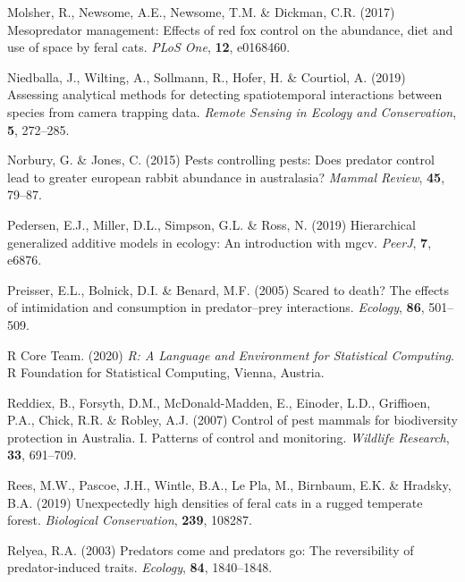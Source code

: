\documentclass[]{elsarticle} %
\begin{document}
\leavevmode\hypertarget{ref-molsher2017mesopredator}{}%
Molsher, R., Newsome, A.E., Newsome, T.M. \& Dickman, C.R. (2017) Mesopredator management: Effects of red fox control on the abundance, diet and use of space by feral cats. \emph{PLoS One}, \textbf{12}, e0168460.

\leavevmode\hypertarget{ref-niedballa2019assessing}{}%
Niedballa, J., Wilting, A., Sollmann, R., Hofer, H. \& Courtiol, A. (2019) Assessing analytical methods for detecting spatiotemporal interactions between species from camera trapping data. \emph{Remote Sensing in Ecology and Conservation}, \textbf{5}, 272--285.

\leavevmode\hypertarget{ref-norbury2015pests}{}%
Norbury, G. \& Jones, C. (2015) Pests controlling pests: Does predator control lead to greater european rabbit abundance in australasia? \emph{Mammal Review}, \textbf{45}, 79--87.

\leavevmode\hypertarget{ref-pedersen2019hierarchical}{}%
Pedersen, E.J., Miller, D.L., Simpson, G.L. \& Ross, N. (2019) Hierarchical generalized additive models in ecology: An introduction with mgcv. \emph{PeerJ}, \textbf{7}, e6876.

\leavevmode\hypertarget{ref-preisser2005scared}{}%
Preisser, E.L., Bolnick, D.I. \& Benard, M.F. (2005) Scared to death? The effects of intimidation and consumption in predator--prey interactions. \emph{Ecology}, \textbf{86}, 501--509.

\leavevmode\hypertarget{ref-R}{}%
R Core Team. (2020) \emph{R: A Language and Environment for Statistical Computing}. R Foundation for Statistical Computing, Vienna, Austria.

\leavevmode\hypertarget{ref-reddiex2007control}{}%
Reddiex, B., Forsyth, D.M., McDonald-Madden, E., Einoder, L.D., Griffioen, P.A., Chick, R.R. \& Robley, A.J. (2007) Control of pest mammals for biodiversity protection in Australia. I. Patterns of control and monitoring. \emph{Wildlife Research}, \textbf{33}, 691--709.

\leavevmode\hypertarget{ref-rees2019unexpectedly}{}%
Rees, M.W., Pascoe, J.H., Wintle, B.A., Le Pla, M., Birnbaum, E.K. \& Hradsky, B.A. (2019) Unexpectedly high densities of feral cats in a rugged temperate forest. \emph{Biological Conservation}, \textbf{239}, 108287.

\leavevmode\hypertarget{ref-relyea2003predators}{}%
Relyea, R.A. (2003) Predators come and predators go: The reversibility of predator-induced traits. \emph{Ecology}, \textbf{84}, 1840--1848.
\end{document}
